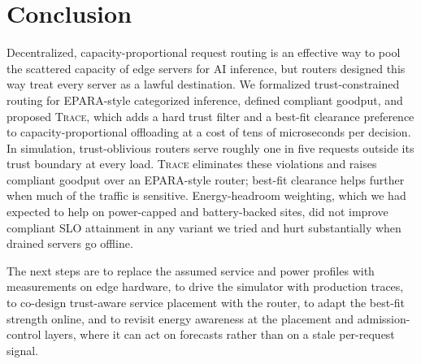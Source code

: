 \documentclass[journal]{IEEEtran}
\newcommand{\sys}{\textsc{Trace}}
\begin{document}
\section{Conclusion}\label{sec:conclusion}

Decentralized, capacity-proportional request routing is an effective way to pool the scattered capacity of edge servers for AI inference, but routers designed this way treat every server as a lawful destination. We formalized trust-constrained routing for EPARA-style categorized inference, defined compliant goodput, and proposed \sys{}, which adds a hard trust filter and a best-fit clearance preference to capacity-proportional offloading at a cost of tens of microseconds per decision. In simulation, trust-oblivious routers serve roughly one in five requests outside its trust boundary at every load. \sys{} eliminates these violations and raises compliant goodput over an EPARA-style router; best-fit clearance helps further when much of the traffic is sensitive. Energy-headroom weighting, which we had expected to help on power-capped and battery-backed sites, did not improve compliant SLO attainment in any variant we tried and hurt substantially when drained servers go offline.

The next steps are to replace the assumed service and power profiles with measurements on edge hardware, to drive the simulator with production traces, to co-design trust-aware service placement with the router, to adapt the best-fit strength online, and to revisit energy awareness at the placement and admission-control layers, where it can act on forecasts rather than on a stale per-request signal.
\end{document}
